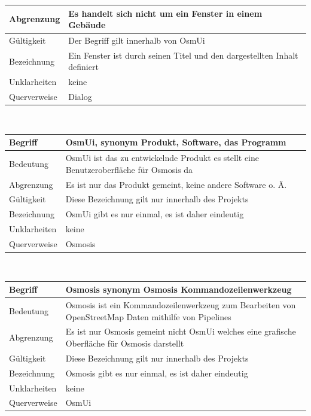 \documentclass[a4paper,12pt]{scrartcl}
\begin{document}
\begin{center}
\begin{tabular}{|p{5cm}|p{10cm}|}
\hline Abgrenzung & Es handelt sich nicht um ein Fenster in einem Gebäude\\ 
\hline Gültigkeit & Der Begriff gilt innerhalb von OsmUi\\ 
\hline Bezeichnung & Ein Fenster ist durch seinen Titel und den dargestellten Inhalt definiert \\ 
\hline Unklarheiten & keine \\ 
\hline Querverweise & Dialog \\ 
\hline
\end{tabular}
\vspace{0.7cm}
\\
\begin{tabular}{|p{5cm}|p{10cm}|}
\hline Begriff & \textbf{OsmUi}, synonym Produkt, Software, das Programm \\ 
\hline Bedeutung & OsmUi ist das zu entwickelnde Produkt es stellt eine Benutzeroberfläche für Osmosis da \\ 
\hline Abgrenzung & Es ist nur das Produkt gemeint, keine andere Software o. Ä. \\ 
\hline Gültigkeit & Diese Bezeichnung gilt nur innerhalb des Projekts \\ 
\hline Bezeichnung & OsmUi gibt es nur einmal, es ist daher eindeutig \\ 
\hline Unklarheiten & keine \\ 
\hline Querverweise & Osmosis \\ 
\hline 
\end{tabular}
\vspace{0.7cm}
\\
\begin{tabular}{|p{5cm}|p{10cm}|}
\hline Begriff & \textbf{Osmosis} synonym Osmosis Kommandozeilenwerkzeug\\ 
\hline Bedeutung & Osmosis ist ein Kommandozeilenwerkzeug zum Bearbeiten von OpenStreetMap Daten mithilfe von Pipelines \\ 
\hline Abgrenzung & Es ist nur Osmosis gemeint nicht OsmUi welches eine grafische Oberfläche für Osmosis darstellt\\ 
\hline Gültigkeit & Diese Bezeichnung gilt nur innerhalb des Projekts \\ 
\hline Bezeichnung & Osmosis gibt es nur einmal, es ist daher eindeutig \\ 
\hline Unklarheiten & keine \\ 
\hline Querverweise & OsmUi \\ 
\hline 
\end{tabular}

\end{center}
\end{document}
